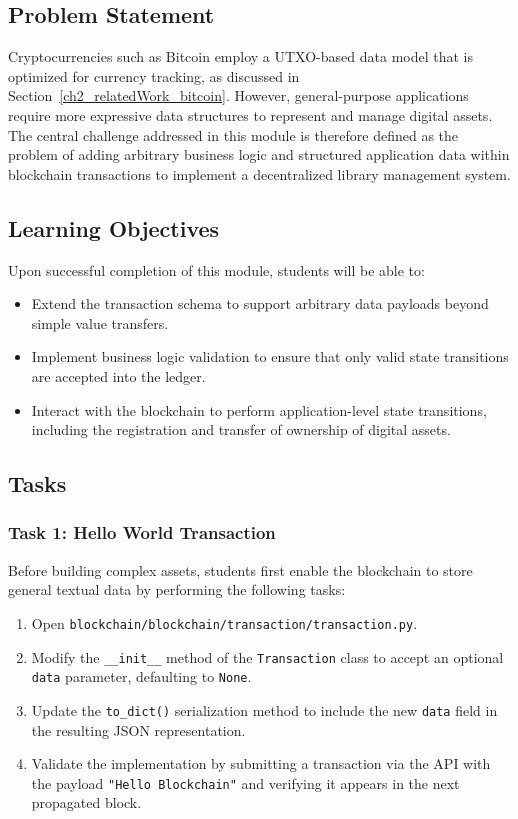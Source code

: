 \subsection{Problem Statement}

Cryptocurrencies such as Bitcoin employ a UTXO-based data model that is optimized for currency tracking, as discussed in Section~\ref{ch2_relatedWork_bitcoin}. However, general-purpose applications require more expressive data structures to represent and manage digital assets. The central challenge addressed in this module is therefore defined as the problem of adding arbitrary business logic and structured application data within blockchain transactions to implement a decentralized library management system.

\subsection{Learning Objectives}
Upon successful completion of this module, students will be able to:
\begin{itemize}
    \item Extend the transaction schema to support arbitrary data payloads beyond simple value transfers.
    \item Implement business logic validation to ensure that only valid state transitions are accepted into the ledger.
    \item Interact with the blockchain to perform application-level state transitions, including the registration and transfer of ownership of digital assets.
\end{itemize}

\newpage

\subsection{Tasks}

\subsubsection*{Task 1: Hello World Transaction}
Before building complex assets, students first enable the blockchain to store general textual data by performing the following tasks:

\begin{enumerate}
    \item Open \texttt{blockchain/blockchain/transaction/transaction.py}.
    \item Modify the \texttt{\_\_init\_\_} method of the \texttt{Transaction} class to accept an optional \texttt{data} parameter, defaulting to \texttt{None}.
    \item Update the \texttt{to\_dict()} serialization method to include the new \texttt{data} field in the resulting JSON representation.
    \item Validate the implementation by submitting a transaction via the API with the payload \texttt{"Hello Blockchain"} and verifying it appears in the next propagated block.
\end{enumerate}

